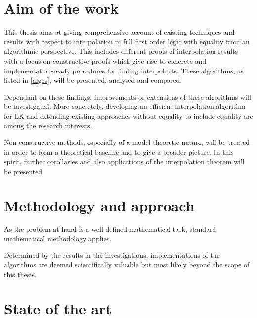 \documentclass[,%
			paper=a4,%
			DIV12,
			liststotoc,
			bibtotoc,
			draft=false,%
			numbers=noendperiod
			]{scrartcl}
\theoremstyle{definition}
\begin{document}
\section{Aim of the work}


This thesis aims at giving comprehensive account of existing techniques and results with respect to interpolation in full first order logic with equality from an algorithmic perspective.
This includes different proofs of interpolation results with a focus on constructive proofs which give rise to concrete and implementation-ready procedures for finding interpolants.
These algorithms, as listed in \ref{algos}, will be presented, analysed and compared. 

Dependant on these findings, improvements or extensions of these algorithms will be investigated.
More concretely, developing an efficient interpolation algorithm for LK and extending existing approaches without equality to include equality are among the research interests.

Non-constructive methods, especially of a model theoretic nature, will be treated in order to form a theoretical baseline and to give a broader picture.
In this spirit, further corollaries and also applications of the interpolation theorem will be presented.



\section{Methodology and approach}

As the problem at hand is a well-defined mathematical task, standard mathematical methodology applies.

Determined by the results in the investigations, implementations of the algorithms are deemed scientifically valuable but most likely beyond the scope of this thesis.


\section{State of the art}
\end{document}
